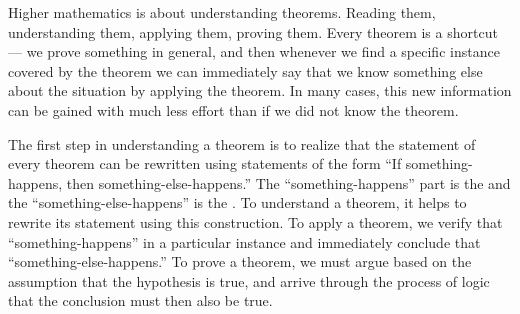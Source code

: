 \begin{para}Higher mathematics is about understanding theorems.  Reading them, understanding them,  applying them, proving them.  Every theorem is a shortcut --- we prove something in general, and then whenever we find a specific instance covered by the theorem we can immediately say that we know something else about the situation by applying the theorem.  In many cases, this new information can be gained with much less effort than if we did not know the theorem.\end{para}
%
\begin{para}The first step in understanding a theorem is to realize that the statement of every theorem can be rewritten using statements of the form ``If something-happens, then something-else-happens.''  The ``something-happens'' part is the  and the ``something-else-happens'' is the .  To understand a theorem, it helps to rewrite its statement using this construction.  To apply a theorem, we verify that ``something-happens'' in a particular instance and immediately conclude that ``something-else-happens.''  To prove a theorem, we must argue based on the assumption that the hypothesis is true, and arrive through the process of logic that the conclusion must then also be true.\end{para}
